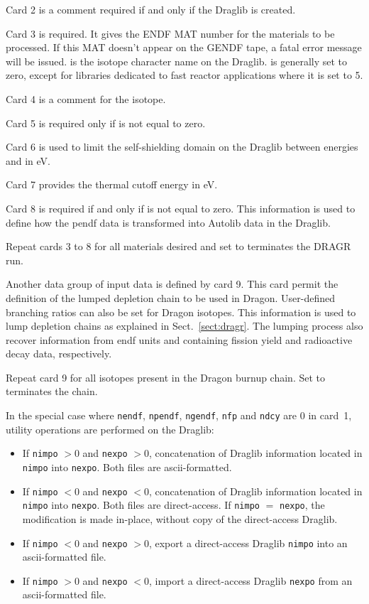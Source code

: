 Card 2 is a comment required if and only if the Draglib is created.

Card 3 is required.  It gives the ENDF MAT number for
the materials to be processed.  If this MAT doesn't appear on
the GENDF tape, a fatal error message will be issued. 
is the isotope character name on the Draglib.  is
generally set to zero, except for libraries dedicated to fast
reactor applications where it is set to 5.

Card 4 is a comment for the isotope.

Card 5 is required only if  is not equal to zero.

Card 6 is used to limit the self-shielding domain on the Draglib between
energies  and  in eV.

Card 7 provides the thermal cutoff energy in eV.

Card 8 is required if and only if  is not equal to zero.
This information is used to define how the pendf data is transformed
into Autolib data in the Draglib.

Repeat cards 3 to 8 for all materials desired and set 
to terminates the DRAGR run.

Another data group of input data is defined by card 9. This card
permit the definition of the lumped depletion chain to be used in Dragon.
User-defined branching ratios can also be set for Dragon isotopes. This
information is used to lump depletion chains as explained in
Sect.~\ref{sect:dragr}. The lumping process also recover information from
endf units  and  containing fission yield and
radioactive decay data, respectively.

Repeat card 9 for all isotopes present in the Dragon burnup chain. Set
 to terminates the chain.

In the special case where {\tt nendf}, {\tt npendf}, {\tt ngendf}, {\tt nfp}
and {\tt ndcy} are 0 in card~1, utility operations are performed on the Draglib:
\begin{itemize}
\item If {\tt nimpo} $>0$ and {\tt nexpo} $>0$, concatenation of Draglib
information located in {\tt nimpo} into {\tt nexpo}. Both files are
ascii-formatted.
\item If {\tt nimpo} $<0$ and {\tt nexpo} $<0$, concatenation of Draglib
information located in {\tt nimpo} into {\tt nexpo}. Both files are
direct-access. If {\tt nimpo} $=$ {\tt nexpo}, the modification is made
in-place, without copy of the direct-access Draglib.
\item If {\tt nimpo} $<0$ and {\tt nexpo} $>0$, export a direct-access Draglib 
{\tt nimpo} into an ascii-formatted file.
\item If {\tt nimpo} $>0$ and {\tt nexpo} $<0$, import a direct-access Draglib
{\tt nexpo} from an ascii-formatted file.
\end{itemize}

\cleardoublepage
